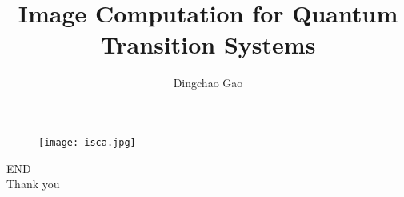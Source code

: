 \documentclass[aspectratio=1610]{beamer}
\title[TDD in quantum]{Image Computation for Quantum Transition Systems}
\author[Gcc]{Dingchao Gao}
\begin{document}
\begin{frame}[plain]
  \titlepage
  \begin{figure}
    \texttt{[image: isca.jpg]}
  \end{figure}
\end{frame}

\begin{frame}
\centering
\Huge{END\\Thank you}
\end{frame}
\end{document}
